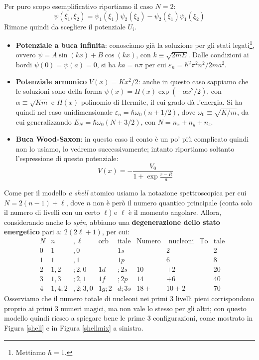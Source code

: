 Per puro scopo esemplificativo riportiamo il caso $N=2$:
$$\psi (\xi_1,\xi_2) = \psi_1 (\xi_1)\psi_2 (\xi_2) - \psi_2 (\xi_1)\psi_1 (\xi_2)$$
Rimane quindi da scegliere il potenziale $U_i$.
\begin{itemize}
    \item \textbf{Potenziale a buca infinita}: conosciamo già la soluzione per gli stati legati\footnote{Mettiamo $\hbar=1$.}, ovvero $\psi = A \sin (kx) + B \cos (kx)$, con $k\equiv \sqrt{2mE}$. Dalle condizioni ai bordi $\psi(0)=\psi(a)=0$, si ha $ka = n\pi$ per cui $\varepsilon_n = \hbar^2 \pi^2  n^2 / 2ma^2$.
    \item \textbf{Potenziale armonico} $V(x)=Kx^2/2$: anche in questo caso sappiamo che le soluzioni sono della forma $\psi(x) = H(x)\exp{(-\alpha x^2/2)}$, con $\alpha \equiv \sqrt{Km}$ e $H(x)$ polinomio di Hermite, il cui grado dà l'energia. Si ha quindi nel caso unidimensionale $\varepsilon_n = \hbar \omega_0 (n+1/2)$, dove $\omega_0 \equiv \sqrt{K/m}$, da cui generalizzando $E_N= \hbar \omega_0 (N+3/2)$, con $N= n_x+n_y+n_z$.
    \item \textbf{Buca Wood-Saxon}: in questo caso il conto è un po' più complicato quindi non lo usiamo, lo vedremo successivamente; intanto riportiamo soltanto l'espressione di questo potenziale:
    $$V(x) = - \frac{V_0}{1+\exp{\frac{r-R}{a}}}$$
\end{itemize}
\noindent Come per il modello \textit{a shell} atomico usiamo la notazione spettroscopica per cui $N = 2(n-1)+\ell$, dove $n$ non è però il numero quantico principale (conta solo il numero di livelli con un certo $\ell$) e $\ell$ è il momento angolare. Allora, considerando anche lo \textit{spin}, abbiamo una \textbf{degenerazione dello stato energetico} pari a: $2(2\ell+1)$, per cui:
\begin{displaymath}
\begin{aligned}
&N & n&,\ell & \text{orb}&\text{itale} & \text{Numero}&\text{ nucleoni} & \text{To}&\text{tale}\\
&0 & 1&,0 & &1s & &2 & &2   \\
&1 & 1&,1 & &1p & &6 & &8   \\
&2 & 1,2&;2,0 & 1d&;2s & 10&+2 & &20 \\
&3 & 1,3&;2,1 & 1f&;2p & 14&+6 & &40   \\
&4 & 1,4;2&,2;3,0 & 1g;2&d;3s & 18+&10+2 & &70
\end{aligned}
\end{displaymath}
Osserviamo che il numero totale di nucleoni nei primi 3 livelli pieni corrispondono proprio ai primi 3 numeri magici, ma non vale lo stesso per gli altri; con questo modello quindi riesco a spiegare bene le prime 3 configurazioni, come mostrato in Figura \ref{shell} e in Figura \ref{shellmix} a sinistra.
